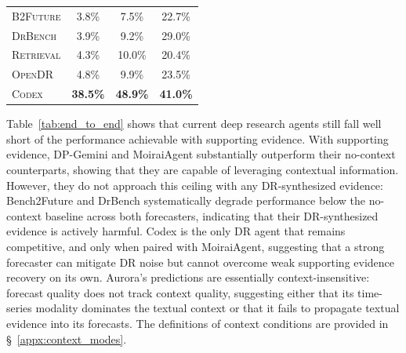 \documentclass[]{servicenow}
\begin{document}
\begin{table}[h]
\begin{minipage}[t]{0.44\textwidth}
{\begin{tabular}{lccc}
        \midrule
        \textsc{B2Future} & 3.8\% & 7.5\% & 22.7\% \\
        \textsc{DrBench} & 3.9\% & 9.2\% & 29.0\% \\
        \textsc{Retrieval} & 4.3\% & 10.0\% & 20.4\% \\
        \textsc{OpenDR} & 4.8\% & 9.9\% & 23.5\% \\
        \textsc{Codex} & \textbf{38.5\%} & \textbf{48.9\%} & \textbf{41.0\%} \\
        \bottomrule
    \end{tabular}
    }
    \vspace{-1.8pt}
    \label{tab:agent_retrieval_metrics_transposed}
\end{minipage}
\end{table}

Table~\ref{tab:end_to_end} shows that current deep research agents still fall well short of the performance achievable with supporting evidence.
With supporting evidence, DP-Gemini and MoiraiAgent substantially outperform their no-context counterparts, showing that they are capable of leveraging contextual information. However, they do not approach this ceiling with any DR-synthesized evidence: Bench2Future and DrBench systematically degrade performance below the no-context baseline across both forecasters, indicating that their DR-synthesized evidence is actively harmful. Codex is the only DR agent that remains competitive, and only when paired with MoiraiAgent, suggesting that a strong forecaster can mitigate DR noise but cannot overcome weak supporting evidence recovery on its own. 
Aurora's predictions are essentially context-insensitive: forecast quality does not track context quality, suggesting either that its time-series modality dominates the textual context or that it fails to propagate textual evidence into its forecasts. 
The definitions of context conditions are provided in \S~\ref{appx:context_modes}.
\end{document}
